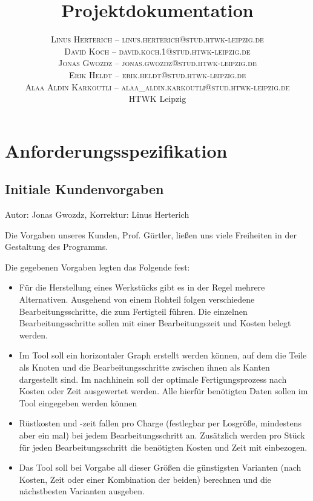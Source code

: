 \documentclass[twoside]{report}
\title{\vspace{-5mm}%
	\fontsize{24pt}{10pt}\selectfont
	\textbf{Projektdokumentation}
	}
\author{%
	\large
	\textsc{Linus Herterich -- linus.herterich@stud.htwk-leipzig.de} \\[2mm]
	\textsc{David Koch -- david.koch.1@stud.htwk-leipzig.de} \\[2mm]
	\textsc{Jonas Gwozdz -- jonas.gwozdz@stud.htwk-leipzig.de} \\[2mm]
	\textsc{Erik Heldt -- erik.heldt@stud.htwk-leipzig.de} \\[2mm]
	\textsc{Alaa Aldin Karkoutli -- alaa_aldin.karkoutli@stud.htwk-leipzig.de} \\[2mm]
	\normalsize	HTWK Leipzig 
	}
\date{}
\begin{document}

\maketitle
\thispagestyle{fancy}

\tableofcontents


\section{Anforderungsspezifikation}

\subsection{Initiale Kundenvorgaben}
{\small Autor: Jonas Gwozdz, Korrektur: Linus Herterich}

\vspace{\baselineskip}
\noindent Die Vorgaben unseres Kunden, Prof. Gürtler, ließen uns viele Freiheiten in der Gestaltung des Programms. \par

\noindent Die gegebenen Vorgaben legten das Folgende fest: \par
\begin{itemize}
  \item Für die Herstellung eines Werkstücks gibt es in der Regel mehrere Alternativen.
  Ausgehend von einem Rohteil folgen verschiedene   Bearbeitungsschritte, die zum Fertigteil führen. 
  Die einzelnen Bearbeitungsschritte sollen mit einer Bearbeitungszeit und Kosten belegt werden. \par

  \item Im Tool soll ein horizontaler Graph erstellt werden können, auf dem die Teile als Knoten und 
  die Bearbeitungsschritte zwischen ihnen als Kanten dargestellt sind. Im nachhinein soll der optimale 
  Fertigungsprozess nach Kosten oder Zeit ausgewertet werden. Alle hierfür benötigten Daten sollen im Tool eingegeben werden können\par

  \item Rüstkosten und -zeit fallen pro Charge (festlegbar per Losgröße, mindestens aber ein mal) bei jedem Bearbeitungsschritt an. 
  Zusätzlich werden pro Stück für jeden Bearbeitungsschritt die benötigten Kosten und Zeit mit einbezogen. \par

  \item Das Tool soll bei Vorgabe all dieser Größen die günstigsten Varianten (nach Kosten, Zeit oder einer Kombination der beiden) 
  berechnen und die nächstbesten Varianten ausgeben.
\end{itemize}
\end{document}
